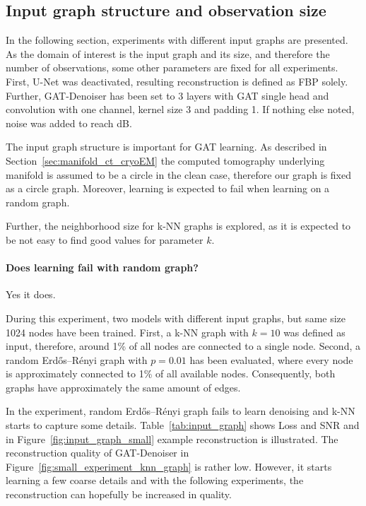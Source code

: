   \subsection{Input graph structure and observation size}
  In the following section, experiments with different input graphs are presented.
  As the domain of interest is the input graph and its size, and therefore the number of observations, 
  some other parameters are fixed for all experiments.
  First, U-Net was deactivated, resulting reconstruction is defined as FBP solely.
  Further, GAT-Denoiser has been set to 3 layers with GAT single head and convolution 
  with one channel, kernel size 3 and padding 1. 
  If nothing else noted, noise was added to reach  dB.

  The input graph structure is important for GAT learning. As described in Section~\ref{sec:manifold_ct_cryoEM}
  \textit{} the computed tomography underlying manifold is assumed to be a circle 
  in the clean case, therefore our graph is fixed as a circle graph. 
  Moreover, learning is expected to fail when learning on a random graph.

  Further, the neighborhood size for k-NN graphs is explored, as it is expected to be not easy to find 
  good values for parameter $k$.

  \paragraph{Does learning fail with random graph?}
  Yes it does.

  During this experiment, two models with different input graphs, but same size 1024 nodes have been trained.
  First, a k-NN graph with $k=10$ was defined as input, therefore, around 1\%  of all nodes are connected to a single node.
  Second, a random Erdős–Rényi graph with $p=0.01$ has been evaluated, where every node is 
  approximately connected to 1\% of all available nodes. Consequently, both graphs have approximately the same amount of edges.
  
  In the experiment, random Erdős–Rényi graph fails to learn denoising and k-NN starts to capture some details.
  Table~\ref{tab:input_graph} shows Loss and SNR and in Figure~\ref{fig:input_graph_small} example reconstruction is illustrated.
  The reconstruction quality of GAT-Denoiser in Figure~\ref{fig:small_experiment_knn_graph} is rather low. 
  However, it starts learning a few coarse details and with the following experiments, the reconstruction can hopefully be 
  increased in quality.

